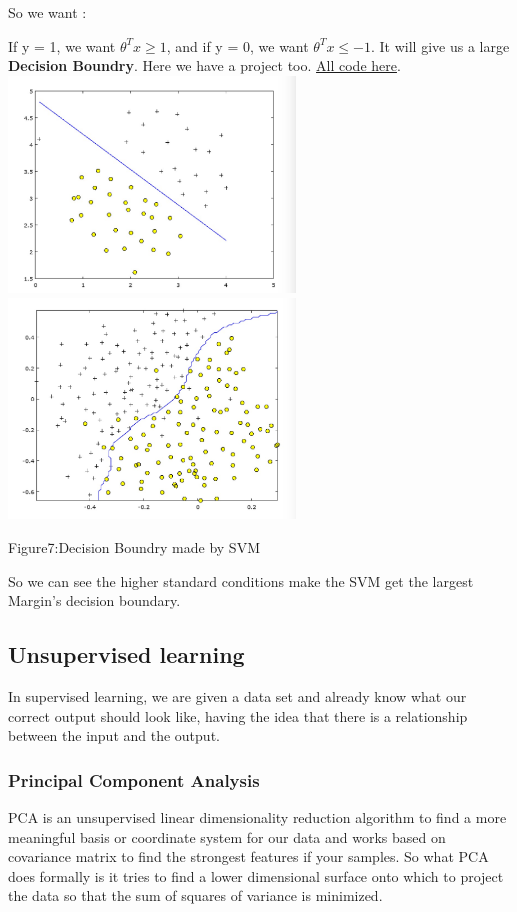 \documentclass[a4paper]{article}
\begin{document}
{ So we want :
 
 If y = 1, we want $ \theta^Tx\ge 1$,
 and if y = 0, we want $\theta^Tx\le -1$. It will give us a large \textbf{Decision Boundry}. Here we have a project too.
\href{https://github.com/GuangYueCHEN/ENSIIE/tree/master/Plus/MachineLearning/machine-learning-ex6}{All code here}.\\
\includegraphics[width=3in]{svm2.png}\includegraphics[width=3in]{svm.png}
\begin{center}
Figure7:Decision Boundry made by SVM
\end{center}
So we can see the higher standard conditions make the SVM get the largest Margin’s decision boundary.




\subsection{Unsupervised learning}
In supervised learning, we are given a data set and already know what our correct output should look like, having the idea that there is a relationship between the input and the output.\\
\subsubsection{\textbf{Principal Component Analysis}}
PCA is an unsupervised linear dimensionality reduction algorithm to find a more meaningful basis or coordinate system for our data and works based on covariance matrix to find the strongest features if your samples. So what PCA does formally is it tries to find a lower dimensional surface onto which to project the data so that the sum of squares of variance is minimized.

}
\end{document}
